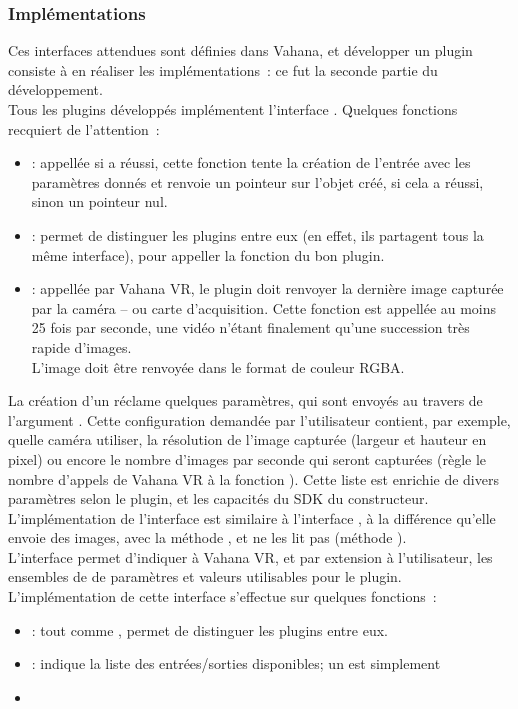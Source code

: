 \subsubsection{Implémentations}
Ces interfaces attendues sont définies dans Vahana, et développer un plugin consiste
à en réaliser les implémentations~: ce fut la seconde partie du développement.\\
Tous les plugins développés implémentent l'interface . Quelques fonctions recquiert 
de l'attention~:
\begin{itemize}
  \item {} : appellée si 
  a réussi, cette fonction tente la création de l'entrée avec les paramètres donnés
  et renvoie un pointeur sur l'objet  créé, si cela a réussi, sinon
  un pointeur nul.
  \item {} : permet de distinguer les plugins entre eux (en
  effet, ils partagent tous la même interface), pour appeller la fonction  
  du bon plugin.
  \item {} : appellée par Vahana VR, le plugin doit renvoyer la
  dernière image capturée par la caméra -- ou carte d'acquisition. Cette fonction
  est appellée au moins 25 fois par seconde, une vidéo n'étant finalement 
  qu'une succession très rapide d'images.\\
  L'image doit être renvoyée dans le format de couleur RGBA.
\end{itemize}
La création d'un  réclame quelques paramètres, qui sont envoyés 
au travers de l'argument . Cette configuration demandée par
l'utilisateur contient, par exemple, quelle caméra utiliser,
la résolution de l'image capturée (largeur et hauteur en pixel) ou encore le nombre d'images
par seconde qui seront capturées (règle le nombre d'appels de Vahana VR à la fonction ). 
Cette liste est enrichie de divers paramètres selon le plugin, et les capacités du SDK du constructeur.\\
L'implémentation de l'interface  est similaire à l'interface ,
à la différence qu'elle envoie des images, avec la méthode , et ne les lit pas (méthode ).\\
\newline
L'interface  permet d'indiquer à Vahana VR, et par extension
à l'utilisateur, les ensembles de de paramètres et valeurs utilisables pour le plugin. 
L'implémentation de cette interface s'effectue sur quelques fonctions~:
\begin{itemize}
  \item {} : tout comme , permet de distinguer les plugins entre eux.
  \item {} : indique la liste des entrées/sorties
  disponibles; un  est simplement
  \item {}
\end{itemize}

